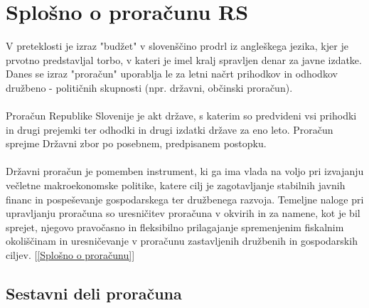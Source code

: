 \documentclass[12pt, a4paper]{article}
\begin{document}
\section[Splošno o proračunu RS]{Splošno o proračunu RS}
V preteklosti je izraz "budžet" v slovenščino prodrl iz angleškega jezika, kjer je prvotno predstavljal torbo, v kateri je imel kralj spravljen denar za javne izdatke. \\
Danes se izraz "proračun" uporablja le za letni načrt prihodkov in odhodkov družbeno - političnih skupnosti (npr. državni, občinski proračun).
 \\
\\
Proračun Republike Slovenije je akt države, s katerim so predvideni vsi prihodki in drugi prejemki ter odhodki in drugi izdatki države za eno leto. Proračun sprejme Državni zbor po posebnem, predpisanem postopku.
\\
\\
Državni proračun je pomemben instrument, ki ga ima vlada na voljo pri izvajanju večletne makroekonomske politike, katere cilj je zagotavljanje stabilnih javnih financ in pospeševanje gospodarskega ter družbenega razvoja. Temeljne naloge pri upravljanju proračuna so uresničitev proračuna v okvirih in za namene, kot je bil sprejet, njegovo pravočasno in fleksibilno prilagajanje spremenjenim fiskalnim okoliščinam in uresničevanje v proračunu zastavljenih družbenih in gospodarskih ciljev. [\ref{Splošno o proračunu}]

\subsection[Sestavni deli proračuna]{Sestavni deli proračuna}
\end{document}

